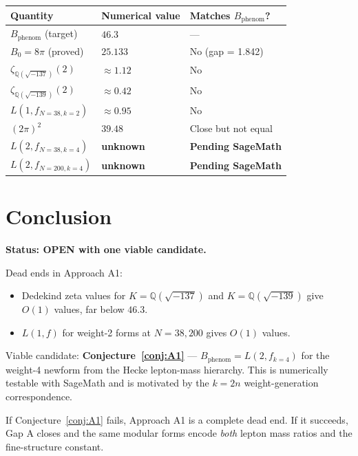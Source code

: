 \documentclass[12pt,a4paper]{article}
\theoremstyle{definition}
\theoremstyle{remark}
\begin{document}
\begin{center}
\begin{tabular}{lll}
  \toprule
  Quantity & Numerical value & Matches $B_{\mathrm{phenom}}$? \\
  \midrule
  $B_{\mathrm{phenom}}$ (target) & $46.3$ & --- \\
  $B_0 = 8\pi$ (proved) & $25.133$ & No (gap = 1.842) \\
  $\zeta_{\mathbb{Q}(\sqrt{-137})}(2)$ & $\approx 1.12$ & No \\
  $\zeta_{\mathbb{Q}(\sqrt{-139})}(2)$ & $\approx 0.42$ & No \\
  $L(1, f_{N=38, k=2})$ & $\approx 0.95$ & No \\
  $(2\pi)^2$ & $39.48$ & Close but not equal \\
  $L(2, f_{N=38, k=4})$ & \textbf{unknown} & \textbf{Pending SageMath} \\
  $L(2, f_{N=200, k=4})$ & \textbf{unknown} & \textbf{Pending SageMath} \\
  \bottomrule
\end{tabular}
\end{center}

\section{Conclusion}
\label{sec:conclusion}

\begin{gapbox}
\textbf{Status: OPEN with one viable candidate.}

Dead ends in Approach A1:
\begin{itemize}
  \item Dedekind zeta values for $K = \mathbb{Q}(\sqrt{-137})$ and
        $K = \mathbb{Q}(\sqrt{-139})$ give $O(1)$ values, far below $46.3$.
  \item $L(1,f)$ for weight-2 forms at $N = 38, 200$ gives $O(1)$ values.
\end{itemize}

Viable candidate: \textbf{Conjecture~\ref{conj:A1}} ---
$B_{\mathrm{phenom}} = L(2, f_{k=4})$ for the weight-4 newform from
the Hecke lepton-mass hierarchy.  This is numerically testable with SageMath
and is motivated by the $k=2n$ weight-generation correspondence.

If Conjecture~\ref{conj:A1} fails, Approach A1 is a complete dead end.
If it succeeds, Gap A closes and the same modular forms encode
\emph{both} lepton mass ratios and the fine-structure constant.
\end{gapbox}

\ifdefined\INCLUDEMODE
\else
  
\end{document}
